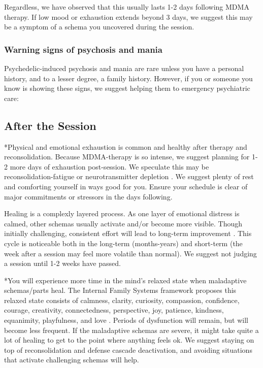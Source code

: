 \documentclass[12pt,letterpaper]{article}
\begin{document}
Regardless, we have observed that this usually lasts 1-2 days following MDMA therapy. If low mood or exhaustion extends beyond 3 days, we suggest this may be a symptom of a schema you uncovered during the session. 
\subsubsection{Warning signs of psychosis and mania}
Psychedelic-induced psychosis and mania are rare unless you have a personal history, and to a lesser degree, a family history. However, if you or someone you know is showing these signs, we suggest helping them to emergency psychiatric care:
\todo{}
\subsection{After the Session}
\label{after}
*Physical and emotional exhaustion is common and healthy after therapy and reconsolidation. Because MDMA-therapy is so intense, we suggest planning for 1-2 more days of exhaustion post-session. We speculate this may be reconsolidation-fatigue or neurotransmitter depletion \cite{razviPSIP}. We suggest plenty of rest and comforting yourself in ways good for you. Ensure your schedule is clear of major commitments or stressors in the days following. 

Healing is a complexly layered process. As one layer of emotional distress is calmed, other schemas usually activate and/or become more visible. Though initially challenging, consistent effort will lead to long-term improvement \cite{vanderKolkBody}. This cycle is noticeable both in the long-term (months-years) and short-term (the week after a session may feel more volatile than normal). We suggest not judging a session until 1-2 weeks have passed.

*You will experience more time in the mind's relaxed state when maladaptive schemas/parts heal. The Internal Family Systems framework proposes this relaxed state consists of calmness, clarity, curiosity, compassion, confidence, courage, creativity, connectedness, perspective, joy, patience, kindness, equanimity, playfulness, and love \cite{schwartzIFS}. Periods of dysfunction will remain, but will become less frequent. If the maladaptive schemas are severe, it might take quite a lot of healing to get to the point where anything feels ok. We suggest staying on top of reconsolidation and defense cascade deactivation, and avoiding situations that activate challenging schemas will help. 
\end{document}
